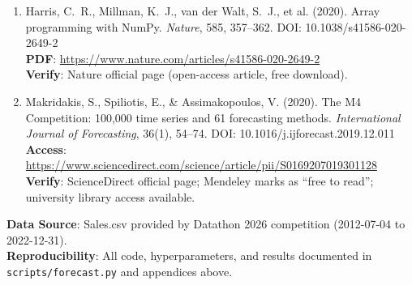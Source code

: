 \documentclass[12pt,a4paper]{article}
\begin{document}
\begin{enumerate}
  \item Harris, C.~R., Millman, K.~J., van der Walt, S.~J., et al. (2020). Array programming with NumPy. \textit{Nature}, 585, 357--362. DOI: 10.1038/s41586-020-2649-2\\
  \textbf{PDF}: \url{https://www.nature.com/articles/s41586-020-2649-2}\\
  \checkmark \textbf{Verify}: Nature official page (open-access article, free download).

  \item Makridakis, S., Spiliotis, E., \& Assimakopoulos, V. (2020). The M4 Competition: 100,000 time series and 61 forecasting methods. \textit{International Journal of Forecasting}, 36(1), 54--74. DOI: 10.1016/j.ijforecast.2019.12.011\\
  \textbf{Access}: \url{https://www.sciencedirect.com/science/article/pii/S0169207019301128}\\
  \checkmark \textbf{Verify}: ScienceDirect official page; Mendeley marks as ``free to read''; university library access available.
\end{enumerate}

\vspace{1cm}
\noindent\textbf{Data Source}: Sales.csv provided by Datathon 2026 competition (2012-07-04 to 2022-12-31).\\
\textbf{Reproducibility}: All code, hyperparameters, and results documented in \texttt{scripts/forecast.py} and appendices above.
\end{document}
